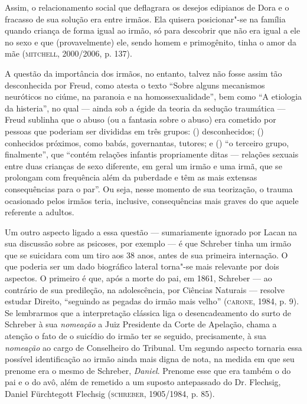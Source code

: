 Assim, o relacionamento social que deflagrara os desejos edipianos de
Dora e o fracasso de sua solução era entre irmãos. Ela quisera
posicionar"-se na família quando criança de forma igual ao irmão, só para
descobrir que não era igual a ele no sexo e que (provavelmente) ele,
sendo homem e primogênito, tinha o amor da mãe (\textsc{mitchell}, 2000/2006, p. 137).

A questão da importância dos irmãos, no entanto, talvez não fosse assim
tão desconhecida por Freud, como atesta o texto ``Sobre alguns
mecanismos neuróticos no ciúme, na paranoia e na homossexualidade'',
bem como ``A etiologia da histeria'', no qual --- ainda sob a égide da
teoria da sedução traumática --- Freud sublinha que o abuso (ou a
fantasia sobre o abuso) era cometido por pessoas que poderiam ser
divididas em três grupos: () desconhecidos; () conhecidos próximos,
como babás, governantas, tutores; e () ``o terceiro grupo, finalmente'',
que ``contém relações infantis propriamente ditas --- relações sexuais
entre duas crianças de sexo diferente, em geral um irmão e uma irmã, que
se prolongam com frequência além da puberdade e têm as mais extensas
consequências para o par''. Ou seja, nesse momento de sua teorização, o
trauma ocasionado pelos irmãos teria, inclusive, consequências mais
graves do que aquele referente a adultos.

Um outro aspecto ligado a essa questão --- sumariamente ignorado por
Lacan na sua discussão sobre as psicoses, por exemplo --- é que Schreber
tinha um irmão que se suicidara com um tiro aos 38 anos, antes de sua
primeira internação. O que poderia ser um dado biográfico lateral
torna"-se mais relevante por dois aspectos. O primeiro é que, após a
morte do pai, em 1861, Schreber --- ao contrário de sua predileção, na
adolescência, por Ciências Naturais --- resolve estudar Direito,
``seguindo as pegadas do irmão mais velho'' (\textsc{carone}, 1984, p. 9). Se
lembrarmos que a interpretação clássica liga o desencadeamento do surto
de Schreber à sua \emph{nomeação} a Juiz Presidente da Corte de
Apelação, chama a atenção o fato de o suicídio do irmão ter se seguido,
precisamente, à sua \emph{nomeação} ao cargo de Conselheiro do Tribunal.
Um segundo aspecto tornaria essa possível identificação ao irmão ainda
mais digna de nota, na medida em que seu prenome era o mesmo de
Schreber, \emph{Daniel}. Prenome esse que era também o do pai e o do
avô, além de remetido a um suposto antepassado do Dr. Flechsig, Daniel
Fürchtegott Flechsig (\textsc{schreber}, 1905/1984, p. 85).

